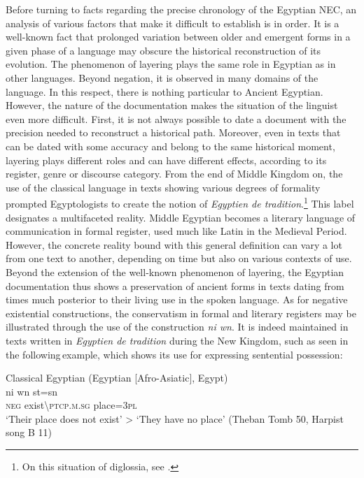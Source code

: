 \documentclass[output=paper]{langsci/langscibook}
\newcommand{\ꜥ}{ʿ}
\newcommand{\ꜣ}{\kern-.25pt\texttt{ꜣ}\kern-.6pt}
\begin{document}
Before turning to facts regarding the precise chronology of the Egyptian NEC, an analysis of various factors that make it difficult to establish is in order. It is a well-known fact that prolonged variation between older and emergent forms in a given phase of a language may obscure the historical reconstruction of its evolution. The phenomenon of layering plays the same role in Egyptian as in other languages. Beyond negation, it is observed in many domains of the language. In this respect, there is nothing particular to Ancient Egyptian. However, the nature of the documentation makes the situation of the linguist even more difficult. First, it is not always possible to date a document with the precision needed to reconstruct a historical path. Moreover, even in texts that can be dated with some accuracy and belong to the same historical moment, layering plays different roles and can have different effects, according to its register, genre or discourse category. From the end of Middle Kingdom on, the use of the classical language in texts showing various degrees of formality prompted Egyptologists to create the notion of \emph{Egyptien de tradition}.\footnote{On this situation of diglossia, see \citet{Vernus1996}.} 
This label designates a multifaceted reality. Middle Egyptian becomes a literary language of communication in formal register, used much like Latin in the Medieval Period. However, the concrete reality bound with this general definition can vary a lot from one text to another, depending on time but also on various contexts of use. Beyond the extension of the well-known phenomenon of layering, the Egyptian documentation thus shows a preservation of ancient forms in texts dating from times much posterior to their living use in the spoken language. As for negative existential constructions, the conservatism in formal and literary registers may be illustrated through the use of the construction \textit{ni wn}. It is indeed maintained in texts written in \emph{Egyptien de tradition} during the New Kingdom, such as seen in the following example, which shows its use for expressing sentential possession:  

\ea Classical Egyptian (Egyptian [Afro-Asiatic], Egypt) \label{ex:AE46}\\
    \gll ni wn st=sn \\
    \textsc{neg} exist\textbackslash\textsc{ptcp.m.sg} place=\textsc{3pl}\\
    \glt ‘Their place does not exist’ > ‘They have no place’ (Theban Tomb 50, Harpist song B 11) 
\z 
 
\end{document}
